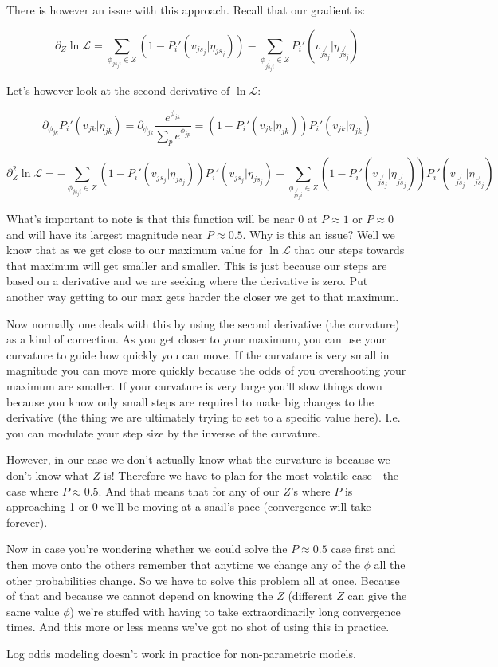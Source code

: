 \documentclass[11pt]{article}
\begin{document}
There is however an issue with this approach. Recall that our gradient is:

$$\partial_Z \ln{\mathcal{L}}=\sum_{\phi_{js_ji} \in Z}\left(1-P_i'(v_{js_j} | \eta_{js_j}) \right)-\sum_{\phi_{j\not{s_j}i}\in Z}P_i'(v_{j\not{s_j}} | \eta_{j\not{s_j}})$$

Let's however look at the second derivative of $\ln{\mathcal{L}}$:

$$\partial_{\phi_{jk}} P_i'(v_{jk} | \eta_{jk})=\partial_{\phi_{jk}} \frac{e^{\phi_{jk}}}{\sum_p e^{\phi_{jp}}}=(1-P_i'(v_{jk} | \eta_{jk}))P_i'(v_{jk} | \eta_{jk})$$


$$\partial^2_Z \ln{\mathcal{L}}=-\sum_{\phi_{js_ji} \in Z}\left(1-P_i'(v_{js_j} | \eta_{js_j}) \right)P_i'(v_{js_j} | \eta_{js_j})-\sum_{\phi_{j\not{s_j}i}\in Z}\left(1-P_i'(v_{j\not{s_j}} | \eta_{j\not{s_j}}) \right)P_i'(v_{j\not{s_j}} | \eta_{j\not{s_j}})$$

What's important to note is that this function will be near 0 at $P\approx 1$ or $P\approx 0$ and will have its largest magnitude near $P \approx 0.5$. Why is this an issue? Well we know that as we get close to our maximum value for $\ln{\mathcal{L}}$ that our steps towards that maximum will get smaller and smaller. This is just because our steps are based on a derivative and we are seeking where the derivative is zero. Put another way getting to our max gets harder the closer we get to that maximum. 

Now normally one deals with this by using the second derivative (the curvature) as a kind of correction. As you get closer to your maximum, you can use your curvature to guide how quickly you can move. If the curvature is very small in magnitude you can move more quickly because the odds of you overshooting your maximum are smaller. If your curvature is very large you'll slow things down because you know only small steps are required to make big changes to the derivative (the thing we are ultimately trying to set to a specific value here). I.e. you can modulate your step size by the inverse of the curvature. 

However, in our case we don't actually know what the curvature is because we don't know what $Z$ is! Therefore we have to plan for the most volatile case - the case where $P\approx 0.5$. And that means that for any of our $Z$'s where $P$ is approaching 1 or 0 we'll be moving at a snail's pace (convergence will take forever). 

Now in case you're wondering whether we could solve the $P\approx 0.5$ case first and then move onto the others remember that anytime we change any of the $\phi$ all the other probabilities change. So we have to solve this problem all at once. Because of that and because we cannot depend on knowing the $Z$ (different $Z$ can give the same value $\phi$) we're stuffed with having to take extraordinarily long convergence times. And this more or less means we've got no shot of using this in practice. \newline

Log odds modeling doesn't work in practice for non-parametric models. 
\end{document}
